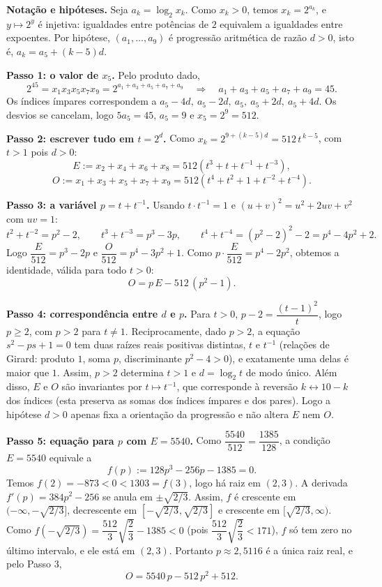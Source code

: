\documentclass{article}%
\begin{document}
\textbf{Notação e hipóteses.} Seja $a_k=\log_2 x_k$. Como $x_k>0$, temos $x_k=2^{a_k}$, e $y\mapsto 2^y$ é injetiva: igualdades entre potências de $2$ equivalem a igualdades entre expoentes. Por hipótese, $(a_1,\dots,a_9)$ é progressão aritmética de razão $d>0$, isto é, $a_k=a_5+(k-5)d$.

\textbf{Passo 1: o valor de $x_5$.} Pelo produto dado,
\[
2^{45}=x_1x_3x_5x_7x_9=2^{a_1+a_3+a_5+a_7+a_9}\quad\Rightarrow\quad a_1+a_3+a_5+a_7+a_9=45.
\]
Os índices ímpares correspondem a $a_5-4d,\ a_5-2d,\ a_5,\ a_5+2d,\ a_5+4d$. Os desvios se cancelam, logo $5a_5=45$, $a_5=9$ e $x_5=2^9=512$.

\textbf{Passo 2: escrever tudo em $t=2^d$.} Como $x_k=2^{9+(k-5)d}=512\,t^{\,k-5}$, com $t>1$ pois $d>0$:
\[
E:=x_2+x_4+x_6+x_8=512\left(t^{3}+t+t^{-1}+t^{-3}\right),
\]
\[
O:=x_1+x_3+x_5+x_7+x_9=512\left(t^{4}+t^{2}+1+t^{-2}+t^{-4}\right).
\]

\textbf{Passo 3: a variável $p=t+t^{-1}$.} Usando $t\cdot t^{-1}=1$ e $(u+v)^2=u^2+2uv+v^2$ com $uv=1$:
\[
t^2+t^{-2}=p^2-2,\qquad t^3+t^{-3}=p^3-3p,\qquad t^4+t^{-4}=(p^2-2)^2-2=p^4-4p^2+2.
\]
Logo $\dfrac{E}{512}=p^3-2p$ e $\dfrac{O}{512}=p^4-3p^2+1$. Como $p\cdot\dfrac{E}{512}=p^4-2p^2$, obtemos a identidade, válida para todo $t>0$:
\[
O=p\,E-512\,(p^2-1).
\]

\textbf{Passo 4: correspondência entre $d$ e $p$.} Para $t>0$, $p-2=\dfrac{(t-1)^2}{t}$, logo $p\ge 2$, com $p>2$ para $t\ne 1$. Reciprocamente, dado $p>2$, a equação $s^2-ps+1=0$ tem duas raízes reais positivas distintas, $t$ e $t^{-1}$ (relações de Girard: produto $1$, soma $p$, discriminante $p^2-4>0$), e exatamente uma delas é maior que $1$. Assim, $p>2$ determina $t>1$ e $d=\log_2 t$ de modo único. Além disso, $E$ e $O$ são invariantes por $t\mapsto t^{-1}$, que corresponde à reversão $k\leftrightarrow 10-k$ dos índices (esta preserva as somas dos índices ímpares e dos pares). Logo a hipótese $d>0$ apenas fixa a orientação da progressão e não altera $E$ nem $O$.

\textbf{Passo 5: equação para $p$ com $E=5540$.} Como $\dfrac{5540}{512}=\dfrac{1385}{128}$, a condição $E=5540$ equivale a
\[
f(p):=128p^3-256p-1385=0.
\]
Temos $f(2)=-873<0<1303=f(3)$, logo há raiz em $(2,3)$. A derivada $f'(p)=384p^2-256$ se anula em $\pm\sqrt{2/3}$. Assim, $f$ é crescente em $(-\infty,-\sqrt{2/3}]$, decrescente em $[-\sqrt{2/3},\sqrt{2/3}]$ e crescente em $[\sqrt{2/3},\infty)$. Como $f(-\sqrt{2/3})=\dfrac{512}{3}\sqrt{\dfrac23}-1385<0$ (pois $\dfrac{512}{3}\sqrt{\dfrac23}<171$), $f$ só tem zero no último intervalo, e ele está em $(2,3)$. Portanto $p\approx 2{,}5116$ é a única raiz real, e pelo Passo 3,
\[
O=5540\,p-512\,p^2+512.
\]
\end{document}
